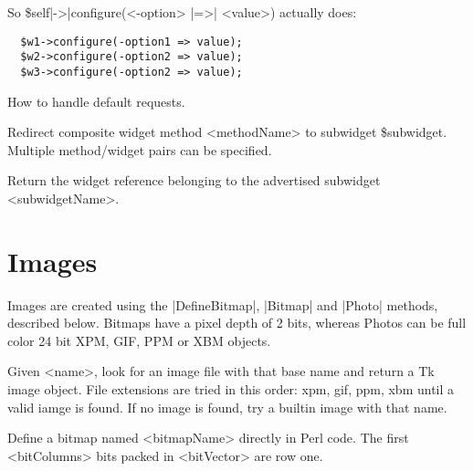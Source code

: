 \begin{enum}{1cm}
So \$self|->|configure(<-option> |=>| <value>) actually does:
\begin{verbatim}
  $w1->configure(-option1 => value);
  $w2->configure(-option2 => value);
  $w3->configure(-option2 => value);
\end{verbatim}

How to handle default  requests.

Redirect composite widget method <methodName> to subwidget \$subwidget.  Multiple method/widget pairs can be
specified.

Return the widget reference belonging to the advertised subwidget <subwidgetName>.

\end{enum}



\section{Images}

Images are created using the |DefineBitmap|, |Bitmap| and |Photo| methods, described below.
Bitmaps have a pixel depth of 2 bits, whereas Photos can be full color 24 bit
XPM, GIF, PPM or XBM objects.

\begin{enum}{1cm}

Given <name>, look for an image file with that base name and return a Tk image object.
File extensions are tried in this order: xpm, gif, ppm, xbm until a valid iamge is found.
If no image is found, try a builtin image with that name. 

Define a bitmap named <bitmapName> directly in Perl code.  The first <bitColumns> bits
packed in <bitVector> are row one.

\end{enum}

